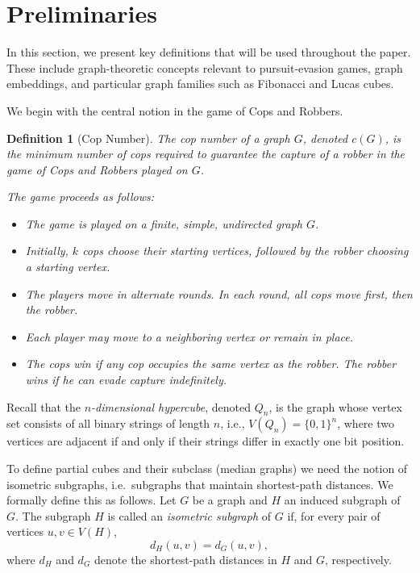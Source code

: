 \documentclass[11pt]{article}
\newtheorem{definition}[theorem]{Definition}
\begin{document}
\section{Preliminaries}
\label{sec:prelim}

In this section, we present key definitions that will be used throughout the paper. These include graph-theoretic concepts relevant to pursuit-evasion games, graph embeddings, and particular graph families such as Fibonacci and Lucas cubes.

We begin with the central notion in the game of Cops and Robbers.

\begin{definition}[Cop Number]
The \emph{cop number} of a graph $G$, denoted $c(G)$, is the minimum number of cops required to guarantee the capture of a robber in the game of Cops and Robbers played on $G$.

The game proceeds as follows:
\begin{itemize}
    \item The game is played on a finite, simple, undirected graph $G$.
    \item Initially, $k$ cops choose their starting vertices, followed by the robber choosing a starting vertex.
    \item The players move in alternate rounds. In each round, all cops move first, then the robber.
    \item Each player may move to a neighboring vertex or remain in place.
    \item The cops win if any cop occupies the same vertex as the robber. The robber wins if he can evade capture indefinitely.
\end{itemize}
\end{definition}

Recall that the \emph{$n$-dimensional hypercube}, denoted $Q_n$, is the graph whose vertex set consists of all binary strings of length $n$, i.e., $V(Q_n) = \{0,1\}^n$, where two vertices are adjacent if and only if their strings differ in exactly one bit position. 

To define partial cubes and their subclass (median graphs) we need the notion of isometric subgraphs, i.e.\ subgraphs that maintain shortest-path distances. We formally define this as follows. 
Let $G$ be a graph and $H$ an induced subgraph of $G$. The subgraph $H$ is called an \emph{isometric subgraph} of $G$ if, for every pair of vertices $u, v \in V(H)$,
\[
d_H(u, v) = d_G(u, v),
\]
where $d_H$ and $d_G$ denote the shortest-path distances in $H$ and $G$, respectively. 
\end{document}
